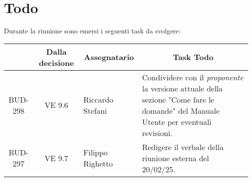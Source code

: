 

\section{Todo}

Durante la riunione sono emersi i seguenti task da svolgere:

\vspace{0.5cm}

\begin{table}[htbp]
\centering
{}
\begin{tabular}{|c|c|p{}|p{}|}
    \hline
    \rowcolor[gray]{0.75}
    \multicolumn{1}{|c|}{\textbf{Codice}} & \multicolumn{1}{|c|}{\textbf{Dalla decisione}} & \multicolumn{1}{|c|}{\textbf{Assegnatario}} & \multicolumn{1}{|c|}{\textbf{Task Todo}} \\
    \hline
    BUD-298 & VE 9.6 & Riccardo Stefani & Condividere con il \emph{proponente} la versione attuale della sezione "Come fare le domande" del Manuale Utente per eventuali revisioni.\\
    \hline
    BUD-297 & VE 9.7 & Filippo Righetto & Redigere il verbale della riunione esterna del 20/02/25. \\
    \hline
\end{tabular}
\end{table}


